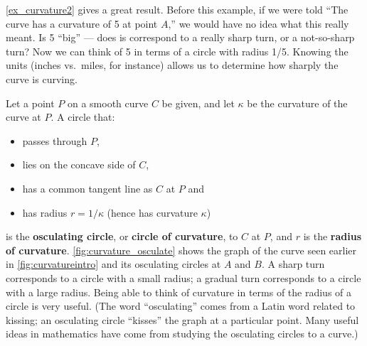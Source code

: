\autoref{ex_curvature2} gives a great result. Before this example, if we were told ``The curve has a curvature of 5 at point $A$,'' we would have no idea what this really meant. Is 5 ``big'' --- does is correspond to a really sharp turn, or a not-so-sharp turn? Now we can think of 5 in terms of a circle with radius 1/5. Knowing the units (inches vs.\ miles, for instance) allows us to determine how sharply the curve is curving.\bigskip

Let a point $P$ on a smooth curve $C$  be given, and let $\kappa$ be the curvature of the curve at $P$. A circle that:
	\begin{itemize}
		\item passes through $P$,
		\item	lies on the concave side of $C$,
		\item	has a common tangent line as $C$ at $P$ and
%
%
		\item	has radius $r=1/\kappa$ (hence has curvature $\kappa$)
	\end{itemize}
is the \textbf{osculating circle}, or \textbf{circle of curvature}, to $C$ at $P$, and $r$ is the \textbf{radius of curvature}. %
\autoref{fig:curvature_osculate} shows the graph of the curve seen earlier in \autoref{fig:curvatureintro} and its osculating circles at $A$ and $B$. A sharp turn corresponds to a circle with a small radius; a gradual turn corresponds to a circle with a large radius. Being able to think of curvature in terms of the radius of a circle is very useful. (The word ``osculating'' comes from a Latin word related to kissing; an osculating circle ``kisses'' the graph at a particular point. Many useful ideas in mathematics have come from studying the osculating circles to a curve.)

